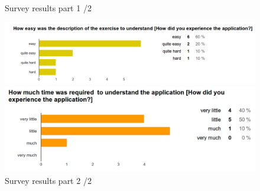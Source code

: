 \begin{figure}[b!]
\begin{minipage}{0.6\textwidth}
    \end{minipage}
  \caption{Survey results part 1 /2 }
  \label{fig:survey1}
\end{figure}

\begin{figure}[b!]
  \centering
    \begin{minipage}{0.7\textwidth}
      \centering
        \includegraphics[width=1\textwidth]{00_resources/figures/survey_results4.png}
    \end{minipage}
    \begin{minipage}{0.7\textwidth}
      \centering
        \includegraphics[width=1\textwidth]{00_resources/figures/survey_results5.png}
    \end{minipage}
  \caption{Survey results part 2 /2 }
  \label{fig:survey2}
\end{figure}

